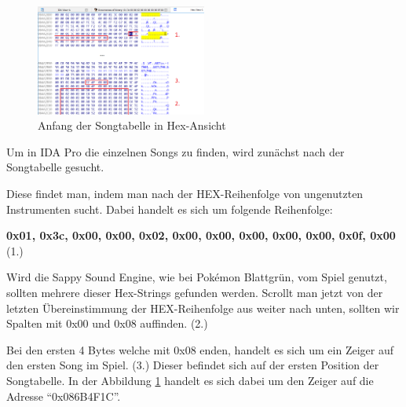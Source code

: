 \documentclass[11pt,a4paper]{scrartcl}
\begin{document}
\vspace{15pt}

\begin{figure}
	\vspace{-10pt}
	\begin{center}
		\includegraphics[width=0.5\textwidth]{Songtabelle}
	\end{center}
	\vspace{-10pt}
	\caption{Anfang der Songtabelle in Hex-Ansicht}
	\label{fig:hex-view}
	\vspace{-30pt}
\end{figure}

Um in IDA Pro die einzelnen Songs zu finden, wird zun\"{a}chst nach der Songtabelle gesucht.

Diese findet man, indem man nach der HEX-Reihenfolge von ungenutzten Instrumenten sucht. Dabei handelt es sich um folgende Reihenfolge: 

\textbf{0x01, 0x3c, 0x00, 0x00, 0x02, 0x00, 0x00, 0x00, 0x00, 0x00, 0x0f, 0x00} (1.)

Wird die Sappy Sound Engine, wie bei Pok\'{e}mon Blattgr\"{u}n, vom Spiel genutzt, sollten mehrere dieser Hex-Strings gefunden werden.
Scrollt man jetzt von der letzten \"{U}bereinstimmung der HEX-Reihenfolge aus weiter nach unten, sollten wir Spalten mit 0x00 und 0x08 auffinden. (2.)

Bei den ersten 4 Bytes welche mit 0x08 enden, handelt es sich um ein Zeiger auf den ersten Song im Spiel. (3.) Dieser befindet sich auf der ersten Position der Songtabelle. 
In der Abbildung \ref{fig:hex-view} handelt es sich dabei um den Zeiger auf die Adresse "`0x086B4F1C"'.

\vspace{15pt}
\end{document}
